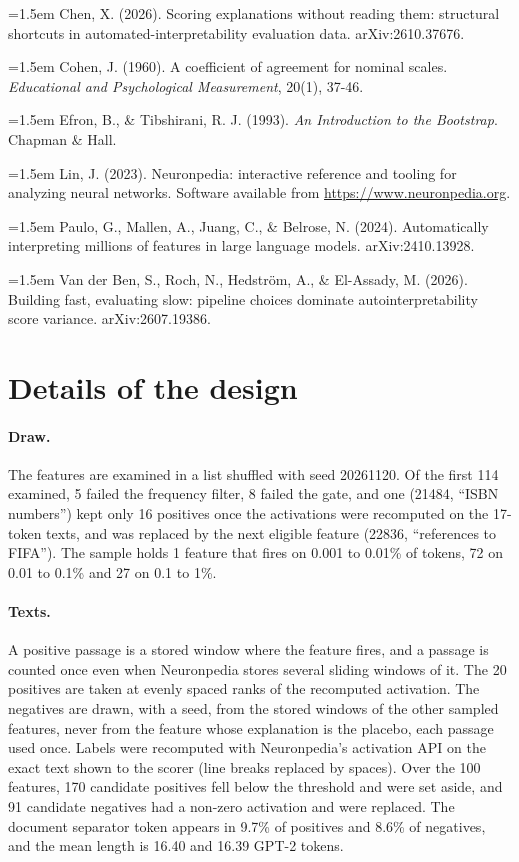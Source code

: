 \documentclass[11pt]{article}
\newcommand{\bibentree}[1]{\par\noindent\hangindent=1.5em\hangafter=1 #1\par\vspace{0.5em}}
\begin{document}
\bibentree{Chen, X. (2026). Scoring explanations without reading them: structural
shortcuts in automated-interpretability evaluation data. arXiv:2610.37676.}

\bibentree{Cohen, J. (1960). A coefficient of agreement for nominal scales.
\emph{Educational and Psychological Measurement}, 20(1), 37-46.}

\bibentree{Efron, B., \& Tibshirani, R. J. (1993). \emph{An Introduction to the
Bootstrap}. Chapman \& Hall.}

\bibentree{Lin, J. (2023). Neuronpedia: interactive reference and tooling for analyzing
neural networks. Software available from \url{https://www.neuronpedia.org}.}

\bibentree{Paulo, G., Mallen, A., Juang, C., \& Belrose, N. (2024). Automatically
interpreting millions of features in large language models. arXiv:2410.13928.}

\bibentree{Van der Ben, S., Roch, N., Hedstr\"om, A., \& El-Assady, M. (2026). Building
fast, evaluating slow: pipeline choices dominate autointerpretability score variance.
arXiv:2607.19386.}

\newpage
\appendix

\section{Details of the design}

\paragraph{Draw.} The features are examined in a list shuffled with seed 20261120.
Of the first 114 examined, 5 failed the frequency filter, 8 failed the gate, and one
(21484, ``ISBN numbers'') kept only 16 positives once the activations were recomputed
on the 17-token texts, and was replaced by the next eligible feature (22836,
``references to FIFA''). The sample holds 1 feature that fires on 0.001 to 0.01\% of
tokens, 72 on 0.01 to 0.1\% and 27 on 0.1 to 1\%.

\paragraph{Texts.} A positive passage is a stored window where the feature fires, and
a passage is counted once even when Neuronpedia stores several sliding windows of it.
The 20 positives are taken at evenly spaced ranks of the recomputed activation. The
negatives are drawn, with a seed, from the stored windows of the other sampled
features, never from the feature whose explanation is the placebo, each passage used
once. Labels were recomputed with Neuronpedia's activation API on the exact text shown
to the scorer (line breaks replaced by spaces). Over the 100 features, 170 candidate
positives fell below the threshold and were set aside, and 91 candidate negatives had a
non-zero activation and were replaced. The document separator token appears in 9.7\%
of positives and 8.6\% of negatives, and the mean length is 16.40 and 16.39 GPT-2 tokens.
\end{document}
